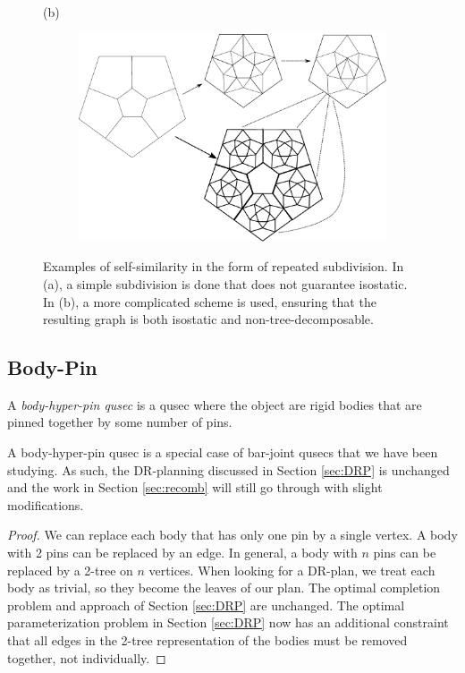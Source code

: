 \begin{figure}
    (b)
    \begin{subfigure}{0.6\linewidth}
        \includegraphics[width=\linewidth]{img/pentawesome}
    \end{subfigure}
    \caption{Examples of self-similarity in the form of repeated subdivision. In (a), a simple subdivision is done that does not guarantee isostatic. In (b), a more complicated scheme is used, ensuring that the resulting graph is both isostatic and non-tree-decomposable.}
    \label{fig:subdivision}
\end{figure}

\subsection{Body-Pin}


\begin{definition}
    A \emph{body-hyper-pin qusec} is a qusec where the object are rigid bodies that are pinned together by some number of pins.
\end{definition}

\begin{remark}
    A body-hyper-pin qusec is a special case of bar-joint qusecs that we have been studying. As such, the DR-planning discussed in Section \ref{sec:DRP} is unchanged and the work in Section \ref{sec:recomb} will still go through with slight modifications.
\end{remark}

\begin{proof}
    We can replace each body that has only one pin by a single vertex. A body with 2 pins can be replaced by an edge. In general, a body with $n$ pins can be replaced by a 2-tree on $n$ vertices. When looking for a DR-plan, we treat each body as trivial, so they become the leaves of our plan. The optimal completion problem and approach of Section \ref{sec:DRP} are unchanged. The optimal parameterization problem in Section \ref{sec:DRP} now has an additional constraint that all edges in the 2-tree representation of the bodies must be removed together, not individually.
\end{proof}

